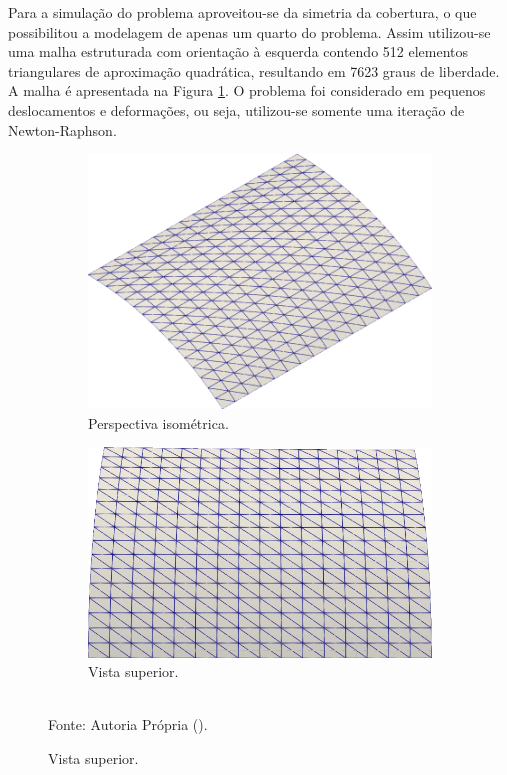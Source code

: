 Para a simulação do problema aproveitou-se da simetria da cobertura, o que possibilitou a modelagem de apenas um quarto do problema. Assim utilizou-se uma malha estruturada com orientação à esquerda contendo 512 elementos triangulares de aproximação quadrática, resultando em 7623 graus de liberdade. A malha é apresentada na Figura \ref{fig:scordelis-mesh}. O problema foi considerado em pequenos deslocamentos e deformações, ou seja, utilizou-se somente uma iteração de Newton-Raphson.

\begin{figure}[h!]
    \centering
    \caption{Malha utilizada na simulação de \textit{Scordelis-Lo roof}.}
    \begin{subfigure}{0.35\textwidth}
        \includegraphics[width=\linewidth]{Figuras/scordelis/malha1.png}
        \caption{Perspectiva isométrica.}
    \end{subfigure}
    \begin{subfigure}{0.35\textwidth}
        \includegraphics[width=\linewidth]{Figuras/scordelis/malha2.png}
        \caption{Vista superior.}
    \end{subfigure}
    \\Fonte: Autoria Própria (\the\year).
    \label{fig:scordelis-mesh}
\end{figure}

